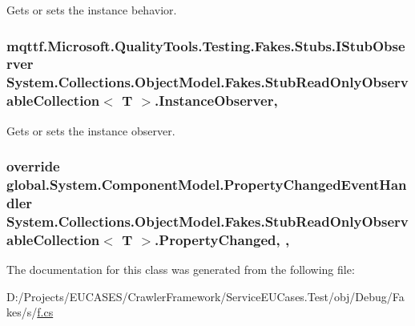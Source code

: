 Gets or sets the instance behavior.

\hypertarget{class_system_1_1_collections_1_1_object_model_1_1_fakes_1_1_stub_read_only_observable_collection_3_01_t_01_4_a9679387b4a19bf25e1a472495afe848a}{
\subsubsection[{Instance\-Observer}]{\setlength{\rightskip}{0pt plus 5cm}mqttf.\-Microsoft.\-Quality\-Tools.\-Testing.\-Fakes.\-Stubs.\-I\-Stub\-Observer System.\-Collections.\-Object\-Model.\-Fakes.\-Stub\-Read\-Only\-Observable\-Collection$<$ T $>$.Instance\-Observer\hspace{0.3cm}{\ttfamily [get]}, {\ttfamily [set]}}}\label{class_system_1_1_collections_1_1_object_model_1_1_fakes_1_1_stub_read_only_observable_collection_3_01_t_01_4_a9679387b4a19bf25e1a472495afe848a}


Gets or sets the instance observer.

\hypertarget{class_system_1_1_collections_1_1_object_model_1_1_fakes_1_1_stub_read_only_observable_collection_3_01_t_01_4_a03580ebb8f7ff0b5d63d90625a653341}{
\subsubsection[{Property\-Changed}]{\setlength{\rightskip}{0pt plus 5cm}override global.\-System.\-Component\-Model.\-Property\-Changed\-Event\-Handler System.\-Collections.\-Object\-Model.\-Fakes.\-Stub\-Read\-Only\-Observable\-Collection$<$ T $>$.Property\-Changed\hspace{0.3cm}{\ttfamily [add]}, {\ttfamily [remove]}, {\ttfamily [protected]}}}\label{class_system_1_1_collections_1_1_object_model_1_1_fakes_1_1_stub_read_only_observable_collection_3_01_t_01_4_a03580ebb8f7ff0b5d63d90625a653341}


The documentation for this class was generated from the following file\-:\begin{DoxyCompactItemize}
\item 
D\-:/\-Projects/\-E\-U\-C\-A\-S\-E\-S/\-Crawler\-Framework/\-Service\-E\-U\-Cases.\-Test/obj/\-Debug/\-Fakes/s/\hyperlink{s_2f_8cs}{f.\-cs}\end{DoxyCompactItemize}
